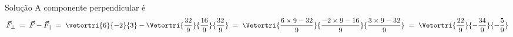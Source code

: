 \begin{resolution}{Solução}
  A componente perpendicular é
  \[
    \vec{F}_{\perp}
    \;=\; \vec{F} - \vec{F}_{\parallel}
    \;=\; \vetortri{6}{-2}{3} - \Vetortri{\frac{32}{9}}{\frac{16}{9}}{\frac{32}{9}}
    \;=\; \Vetortri{\frac{ 6 \times 9 - 32}{9}}
                   {\frac{-2 \times 9 - 16}{9}}
                   {\frac{ 3 \times 9 - 32}{9}}
    \;=\; \Vetortri{\frac{22}{9}}{-\frac{34}{9}}{-\frac{5}{9}}
  \]
\end{resolution}

\endinput
